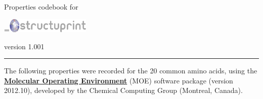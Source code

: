 \documentclass[12pt,a4paper]{article}
\begin{document}
\begin{center}

\LARGE{Properties codebook for} \hspace{-4mm}
{\begingroup
{}=\hbox{\includegraphics[width=0.3\textwidth]{../src/images/splash.png}}
\parbox{\wd0}{}\endgroup}
\LARGE{version 1.001}

\rule{\textwidth}{1pt}
\end{center}

\noindent The following properties were recorded for the 20 common amino acids, using 
the\href{http://www.chemcomp.com/MOE-Molecular_Operating_Environment.htm}{
\textbf{Molecular Operating Environment}} (MOE) software package (version 2012.10), 
developed by the Chemical Computing Group (Montreal, Canada).
\end{document}
